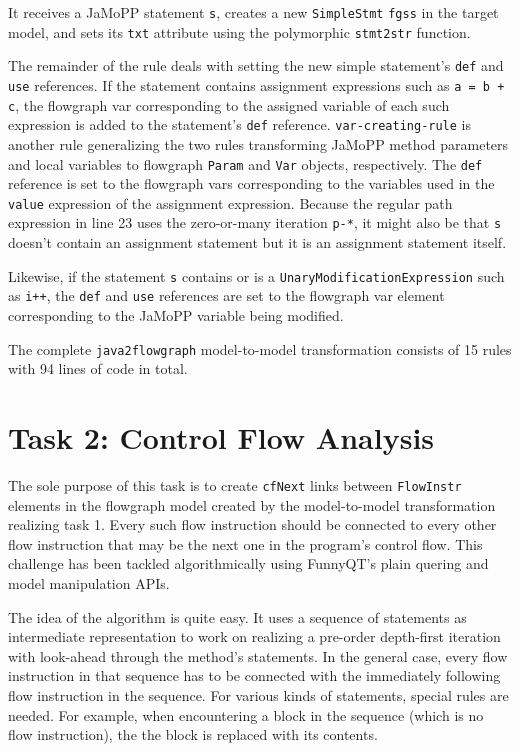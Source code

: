 \documentclass[11pt]{article}
\begin{document}
It receives a JaMoPP statement \verb|s|, creates a new \verb|SimpleStmt|
\verb|fgss| in the target model, and sets its \verb|txt| attribute using the
polymorphic \verb|stmt2str| function.

The remainder of the rule deals with setting the new simple statement's
\verb|def| and \verb|use| references.  If the statement contains assignment
expressions such as \verb|a = b + c|, the flowgraph var corresponding to the
assigned variable of each such expression is added to the statement's
\verb|def| reference.  \verb|var-creating-rule| is another rule generalizing
the two rules transforming JaMoPP method parameters and local variables to
flowgraph \verb|Param| and \verb|Var| objects, respectively.  The \verb|def|
reference is set to the flowgraph vars corresponding to the variables used in
the \verb|value| expression of the assignment expression.  Because the regular
path expression in line 23 uses the zero-or-many iteration \verb|p-*|, it might
also be that \verb|s| doesn't contain an assignment statement but it is an
assignment statement itself.

Likewise, if the statement \verb|s| contains or is a
\verb|UnaryModificationExpression| such as \verb|i++|, the \verb|def| and
\verb|use| references are set to the flowgraph var element corresponding to the
JaMoPP variable being modified.

The complete \verb|java2flowgraph| model-to-model transformation consists of 15
rules with 94 lines of code in total.



\section{Task 2: Control Flow Analysis}
\label{sec:task-2}

The sole purpose of this task is to create \verb|cfNext| links between
\verb|FlowInstr| elements in the flowgraph model created by the model-to-model
transformation realizing task 1.  Every such flow instruction should be
connected to every other flow instruction that may be the next one in the
program's control flow.  This challenge has been tackled algorithmically using
FunnyQT's plain quering and model manipulation APIs.

The idea of the algorithm is quite easy.  It uses a sequence of statements as
intermediate representation to work on realizing a pre-order depth-first
iteration with look-ahead through the method's statements.  In the general
case, every flow instruction in that sequence has to be connected with the
immediately following flow instruction in the sequence.  For various kinds of
statements, special rules are needed.  For example, when encountering a block
in the sequence (which is no flow instruction), the the block is replaced with
its contents.
\end{document}
